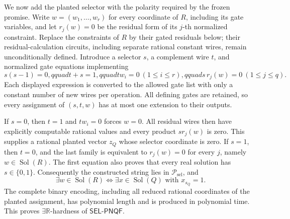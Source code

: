 We now add the planted selector with the polarity required by the frozen promise.  Write \(w=(w_1,\ldots,w_r)\) for every coordinate of \(R\), including its gate variables, and let \(r_j(w)=0\) be the residual form of its \(j\)-th normalized constraint.  Replace the constraints of \(R\) by their gated residuals below; their residual-calculation circuits, including separate rational constant wires, remain unconditionally defined.  Introduce a selector \(s\), a complement wire \(t\), and normalized gate equations implementing
\[
s(s-1)=0,qquad t+s=1,qquad tw_i=0\ (1\le i\le r),qquad s\,r_j(w)=0\ (1\le j\le q).
\]
Each displayed expression is converted to the allowed gate list with only a constant number of new wires per operation.  All defining gates are retained, so every assignment of \((s,t,w)\) has at most one extension to their outputs.

If \(s=0\), then \(t=1\) and \(tw_i=0\) forces \(w=0\).  All residual wires then have explicitly computable rational values and every product \(s r_j(w)\) is zero.  This supplies a rational planted vector \(z_Q\) whose selector coordinate is zero.  If \(s=1\), then \(t=0\), and the last family is equivalent to \(r_j(w)=0\) for every \(j\), namely \(w\in\operatorname{Sol}(R)\).  The first equation also proves that every real solution has \(s\in\{0,1\}\).  Consequently the constructed string lies in \(\mathcal P_{\mathrm{sel}}\), and
\[
\exists w\in\operatorname{Sol}(R)
\Longleftrightarrow
\exists x\in\operatorname{Sol}(Q)\text{ with }x_{s_Q}=1.
\]
The complete binary encoding, including all reduced rational coordinates of the planted assignment, has polynomial length and is produced in polynomial time.  This proves \(\exists\mathbb R\)-hardness of \(\mathsf{SEL\mbox{-}PNQF}\).

